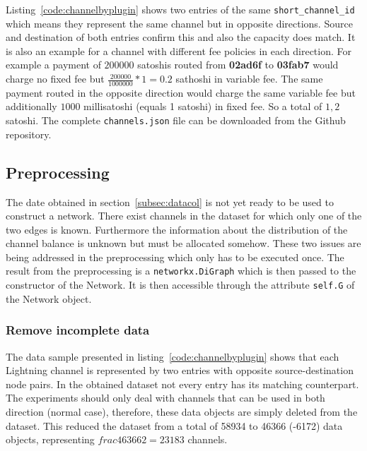 \documentclass[final]{fhnwreport}       %
\begin{document}
Listing~\ref{code:channelbyplugin} shows two entries of the same \texttt{short\_channel\_id} which means they represent the same channel but in opposite directions. Source and destination of both entries confirm this and also the capacity does match. It is also an example for a channel with different fee policies in each direction. For example a payment of $200000$ satoshis routed from \textbf{02ad6f} to \textbf{03fab7} would charge no fixed fee but $\frac{200000}{1000000}*1 = 0.2$ sathoshi in variable fee. The same payment routed in the opposite direction would charge the same variable fee but additionally $1000$ millisatoshi (equals 1 satoshi) in fixed fee. So a total of $1,2$ satoshi. The complete \texttt{channels.json} file can be downloaded from the Github repository. 

\subsection{Preprocessing}\label{subsec:preproc}
The date obtained in section~\ref{subsec:datacol} is not yet ready to be used to construct a network. There exist channels in the dataset for which only one of the two edges is known. Furthermore the information about the distribution of the channel balance is unknown but must be allocated somehow. These two issues are being addressed in the preprocessing which only has to be executed once. The result from the preprocessing is a \texttt{networkx.DiGraph} which is then passed to the constructor of the Network. It is then accessible through the attribute \texttt{self.G} of the Network object.

\subsubsection{Remove incomplete data}
The data sample presented in listing~\ref{code:channelbyplugin} shows that each Lightning channel is represented by two entries with opposite source-destination node pairs. In the obtained dataset not every entry has its matching counterpart. The experiments should only deal with channels that can be used in both direction (normal case), therefore, these data objects are simply deleted from the dataset. This reduced the dataset from a total of 58934 to 46366 (-6172) data objects, representing $frac{46366}{2}=23183$ channels.  
\end{document}
